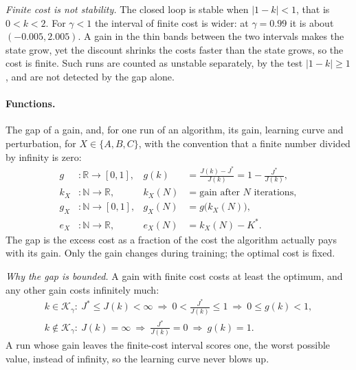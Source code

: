 \documentclass[11pt]{article}
\begin{document}
\emph{Finite cost is not stability.} The closed loop is stable when $|1 - k| < 1$, that is
$0 < k < 2$. For $\gamma < 1$ the interval of finite cost is wider: at $\gamma = 0.99$ it is about
$(-0.005, 2.005)$. A gain in the thin bands between the two intervals makes the state grow, yet the
discount shrinks the costs faster than the state grows, so the cost is finite. Such runs are counted
as unstable separately, by the test $|1 - k| \ge 1$, and are not detected by the gap alone.

\paragraph{Functions.} The gap of a gain, and, for one run of an algorithm, its gain, learning curve
and perturbation, for $X \in \{A, B, C\}$, with the convention that a finite number divided by
infinity is zero:
\begin{align*}
  g &: \mathbb{R} \to [0, 1], & g(k) &= \frac{J(k) - J^*}{J(k)} = 1 - \frac{J^*}{J(k)}, \\
  k_X &: \mathbb{N} \to \mathbb{R}, & k_X(N) &= \text{gain after } N \text{ iterations}, \\
  g_X &: \mathbb{N} \to [0, 1], & g_X(N) &= g\big(k_X(N)\big), \\
  e_X &: \mathbb{N} \to \mathbb{R}, & e_X(N) &= k_X(N) - K^* .
\end{align*}
The gap is the excess cost as a fraction of the cost the algorithm actually pays with its gain. Only
the gain changes during training; the optimal cost is fixed.

\emph{Why the gap is bounded.} A gain with finite cost costs at least the optimum, and any other gain
costs infinitely much:
\begin{gather*}
  k \in \mathcal{K}_\gamma: \ J^* \le J(k) < \infty \ \Longrightarrow\ 0 < \frac{J^*}{J(k)} \le 1
  \ \Longrightarrow\ 0 \le g(k) < 1, \\
  k \notin \mathcal{K}_\gamma: \ J(k) = \infty \ \Longrightarrow\ \frac{J^*}{J(k)} = 0
  \ \Longrightarrow\ g(k) = 1 .
\end{gather*}
A run whose gain leaves the finite-cost interval scores one, the worst possible value, instead of
infinity, so the learning curve never blows up.
\end{document}
